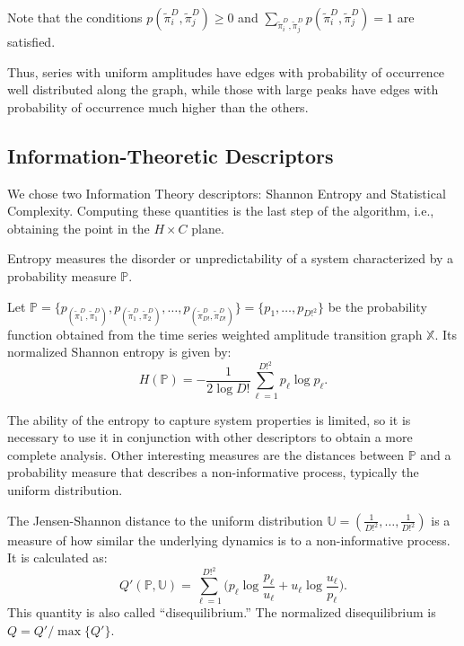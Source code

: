 \documentclass[journal]{IEEEtran}
\begin{document}
Note that the conditions $p(\widetilde\pi^D_i, \widetilde\pi^D_j) \ge 0$ and $\sum_{\widetilde\pi^D_i, \widetilde\pi^D_j} p(\widetilde\pi^D_i, \widetilde\pi^D_j) = 1$ are satisfied.

Thus, series with uniform amplitudes have edges with probability of occurrence well distributed along the graph, while those with large peaks have edges with probability of occurrence much higher than the others.

\subsection{Information-Theoretic Descriptors}\label{HC}

We chose two Information Theory descriptors: Shannon Entropy and Statistical Complexity.
Computing these quantities is the last step of the algorithm, i.e., obtaining the point in the $H \times C$ plane.

Entropy measures the disorder or unpredictability of a system characterized by a probability measure $\mathbb{P}$.

Let $\mathbb{P} = \{p_{(\widetilde\pi^D_1, \widetilde\pi^D_1)}, p_{(\widetilde\pi^D_1, \widetilde\pi^D_2)}, \dots, p_{(\widetilde\pi^D_{D!}, \widetilde\pi^D_{D!})} \} = \{p_1,\dots,p_{D!^2}\}$ be the probability function obtained from the time series weighted amplitude transition graph $\mathbb{X}$.
Its normalized Shannon entropy is given by:	
\begin{equation}
	H(\mathbb{P}) = -\frac1{2\log D!}\sum_{\ell=1}^{D!^2} p_{\ell} \log p_{\ell} .
	\label{eq:Entropia}
\end{equation}

The ability of the entropy to capture system properties is limited, so it is necessary to use it in conjunction with other des\-criptors to obtain a more complete analysis.
Other interesting measures are the distances between $\mathbb{P}$ and a probability measure that describes a non-informative process, typically the uniform distribution.

The Jensen-Shannon distance to the uniform distribution $\mathbb{U} = (\frac{1}{D!^2}, \dots, \frac{1}{D!^2})$ is a measure of how similar the underlying dynamics is to a non-informative process.
It is calculated as:
\begin{equation}
	Q'(\mathbb{P}, \mathbb{U}) = \sum_{\ell=1}^{D!^2} \Big(p_\ell \log\frac{p_\ell}{u_\ell} +
	u_\ell \log\frac{u_\ell}{p_\ell}
	\Big).
\end{equation}
This quantity is also called ``disequilibrium.''
The normalized disequilibrium is $ Q=Q'/\max\{Q'\}$.
\end{document}
